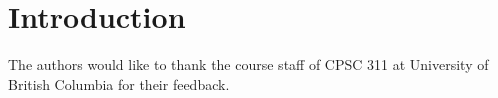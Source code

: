\section{Introduction}

\appendix

\begin{acks}
    The authors would like to thank the course staff of CPSC 311 at University
    of British Columbia for their feedback.
\end{acks}
